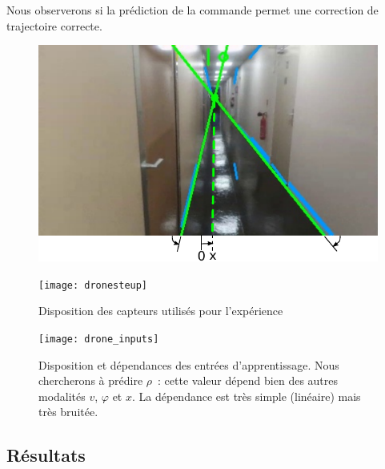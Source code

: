 \documentclass[../main]{subfiles}
\begin{document}
Nous observerons si la prédiction de la commande permet une correction de trajectoire correcte.


\begin{figure}
	\begin{minipage}{0.5\textwidth}
	\includegraphics[width=\textwidth]{visudrone.pdf}
	\end{minipage}
	\begin{minipage}{0.5\textwidth}
	\texttt{[image: dronesteup]}
	\end{minipage}
	\caption{Disposition des capteurs utilisés pour l'expérience}
	\label{fig:drone}
	\end{figure}

\begin{figure}
	\centering\texttt{[image: drone\_inputs]}
	\caption{Disposition et dépendances des entrées d'apprentissage. Nous chercherons à prédire $\rho$~: cette valeur dépend bien des autres modalités $v$, $\varphi$ et $x$. La dépendance est très simple (linéaire) mais très bruitée. \label{fig:drone_inp}}
\end{figure}


\subsection{Résultats}
\end{document}
